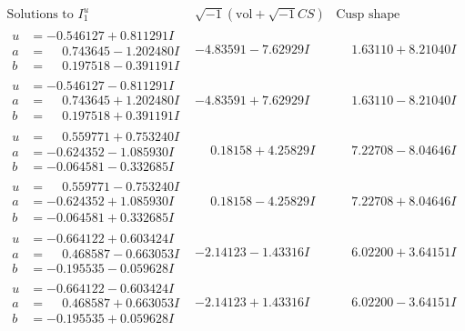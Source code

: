 \documentclass[1p]{elsarticle_modified}
\theoremstyle{definition}
\newcommand{\I}{\sqrt{-1}}
\begin{document}
$$\begin{array}{c|c|c}  
\text{Solutions to }I^u_{1}& \I (\text{vol} + \sqrt{-1}CS) & \text{Cusp shape}\\
 \hline 
\begin{aligned}
u &= -0.546127 + 0.811291 I \\
a &= \phantom{-}0.743645 - 1.202480 I \\
b &= \phantom{-}0.197518 - 0.391191 I\end{aligned}
 & -4.83591 - 7.62929 I & \phantom{-}1.63110 + 8.21040 I \\ \hline\begin{aligned}
u &= -0.546127 - 0.811291 I \\
a &= \phantom{-}0.743645 + 1.202480 I \\
b &= \phantom{-}0.197518 + 0.391191 I\end{aligned}
 & -4.83591 + 7.62929 I & \phantom{-}1.63110 - 8.21040 I \\ \hline\begin{aligned}
u &= \phantom{-}0.559771 + 0.753240 I \\
a &= -0.624352 - 1.085930 I \\
b &= -0.064581 - 0.332685 I\end{aligned}
 & \phantom{-}0.18158 + 4.25829 I & \phantom{-}7.22708 - 8.04646 I \\ \hline\begin{aligned}
u &= \phantom{-}0.559771 - 0.753240 I \\
a &= -0.624352 + 1.085930 I \\
b &= -0.064581 + 0.332685 I\end{aligned}
 & \phantom{-}0.18158 - 4.25829 I & \phantom{-}7.22708 + 8.04646 I \\ \hline\begin{aligned}
u &= -0.664122 + 0.603424 I \\
a &= \phantom{-}0.468587 - 0.663053 I \\
b &= -0.195535 - 0.059628 I\end{aligned}
 & -2.14123 - 1.43316 I & \phantom{-}6.02200 + 3.64151 I \\ \hline\begin{aligned}
u &= -0.664122 - 0.603424 I \\
a &= \phantom{-}0.468587 + 0.663053 I \\
b &= -0.195535 + 0.059628 I\end{aligned}
 & -2.14123 + 1.43316 I & \phantom{-}6.02200 - 3.64151 I \\ \hline\begin{aligned}

\end{aligned}
\end{array}$$
\end{document}
